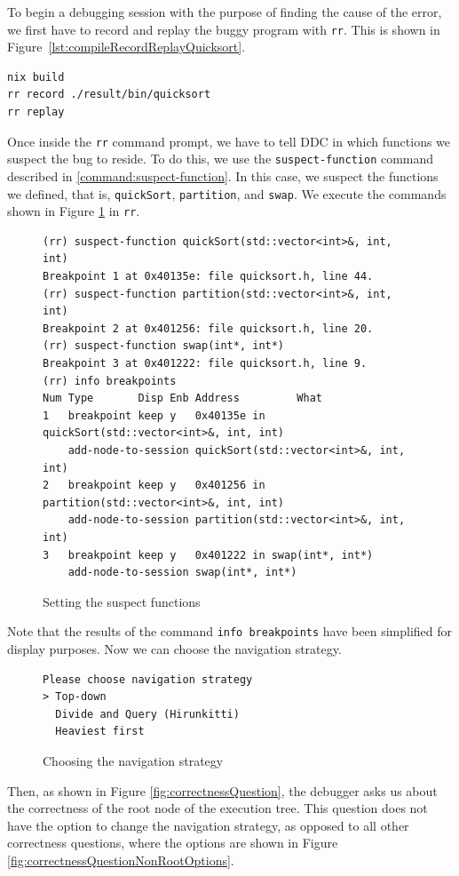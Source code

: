 To begin a debugging session with the purpose of finding the cause of the error, we first have to record and replay the buggy program with \verb|rr|. This is shown in 
Figure~\ref{lst:compileRecordReplayQuicksort}.
\begin{lstlisting}[language=bash, caption={Compiling, recording and replaying quickSort}, frame=tb, label={lst:compileRecordReplayQuicksort}]
nix build
rr record ./result/bin/quicksort
rr replay
\end{lstlisting}
Once inside the \verb|rr| command prompt, we have to tell DDC in which functions we suspect the bug to reside.
To do this, we use the \verb|suspect-function| command described in \ref{command:suspect-function}. In this case, we suspect the functions we defined, that is, \verb|quickSort|, \verb|partition|, and \verb|swap|. We execute the commands shown in Figure \ref{fig:suspecting-functions} in \verb|rr|.
\begin{figure}[h]
    \centering
    \caption{Setting the suspect functions}
    \label{fig:suspecting-functions}
    \begin{verbatim}
(rr) suspect-function quickSort(std::vector<int>&, int, int)
Breakpoint 1 at 0x40135e: file quicksort.h, line 44.
(rr) suspect-function partition(std::vector<int>&, int, int) 
Breakpoint 2 at 0x401256: file quicksort.h, line 20.
(rr) suspect-function swap(int*, int*) 
Breakpoint 3 at 0x401222: file quicksort.h, line 9.
(rr) info breakpoints
Num Type       Disp Enb Address         What
1   breakpoint keep y   0x40135e in quickSort(std::vector<int>&, int, int)
    add-node-to-session quickSort(std::vector<int>&, int, int)
2   breakpoint keep y   0x401256 in partition(std::vector<int>&, int, int)
    add-node-to-session partition(std::vector<int>&, int, int)
3   breakpoint keep y   0x401222 in swap(int*, int*)
    add-node-to-session swap(int*, int*)
    \end{verbatim}
\end{figure}
Note that the results of the command \verb|info breakpoints| have been simplified for display purposes.
Now we can choose the navigation strategy.
\begin{figure}[h]
    \centering
    \caption{Choosing the navigation strategy}
    \label{fig:navigationsStrategyPrompt}
    \begin{verbatim}
Please choose navigation strategy
> Top-down
  Divide and Query (Hirunkitti)
  Heaviest first
    \end{verbatim}
\end{figure}
Then, as shown in Figure \ref{fig:correctnessQuestion}, the debugger asks us about the correctness of the root node of the execution tree. This question does not have the option to change the navigation strategy, as opposed to all other correctness questions, where the options are shown in Figure \ref{fig:correctnessQuestionNonRootOptions}. 

